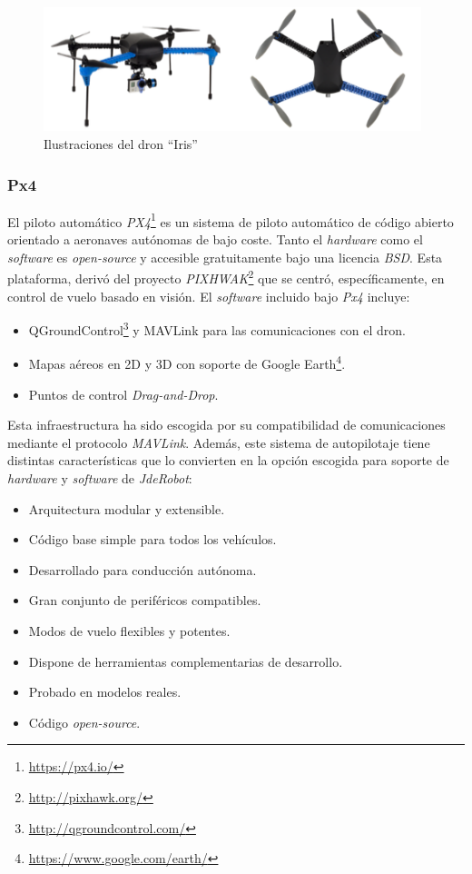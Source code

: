 \begin{figure}[H]
	\begin{center}
	    \includegraphics[width=0.98\textwidth]{figures/iris.png}
		\caption{Ilustraciones del dron ``Iris''}
		\label{fig.iris}
	\end{center}
\end{figure}

\subsubsection{Px4}
El piloto automático \textit{PX4}\footnote{\url{https://px4.io/}} es un sistema de piloto automático de código abierto orientado a aeronaves autónomas de bajo coste. Tanto el \textit{hardware} como el \textit{software} es \textit{open-source} y accesible gratuitamente bajo una licencia \textit{BSD}. Esta plataforma, derivó del proyecto \textit{PIXHWAK}\footnote{\url{http://pixhawk.org/}} que se centró, específicamente, en control de vuelo basado en visión. El \textit{software} incluido bajo \textit{Px4} incluye:
\begin{itemize}
    \item QGroundControl\footnote{\url{http://qgroundcontrol.com/}} y MAVLink para las comunicaciones con el dron.
    \item Mapas aéreos en 2D y 3D con soporte de Google Earth\footnote{\url{https://www.google.com/earth/}}.
    \item Puntos de control \textit{Drag-and-Drop}.
\end{itemize}

Esta infraestructura ha sido escogida por su compatibilidad de comunicaciones mediante el protocolo \textit{MAVLink}. Además, este sistema de autopilotaje tiene distintas características que lo convierten en la opción escogida para soporte de \textit{hardware} y \textit{software} de \textit{JdeRobot}:
\begin{itemize}
    \item Arquitectura modular y extensible.
    \item Código base simple para todos los vehículos.
    \item Desarrollado para conducción autónoma.
    \item Gran conjunto de periféricos compatibles.
    \item Modos de vuelo flexibles y potentes.
    \item Dispone de herramientas complementarias de desarrollo.
    \item Probado en modelos reales.
    \item Código \textit{open-source}.
\end{itemize}

